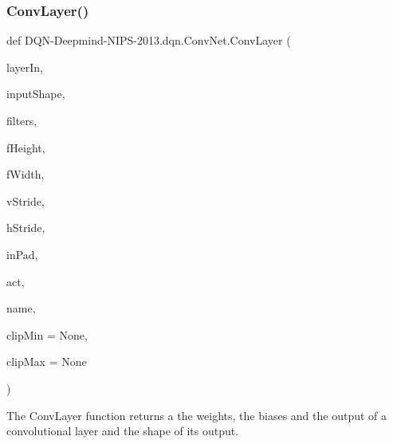 \subsubsection{\texorpdfstring{Conv\+Layer()}{ConvLayer()}}
{\footnotesize\ttfamily def D\+QN-\/Deepmind-\/N\+I\+PS-\/2013.dqn.\+Conv\+Net.\+Conv\+Layer (\begin{DoxyParamCaption}\item[{}]{layer\+In,  }\item[{}]{input\+Shape,  }\item[{}]{filters,  }\item[{}]{f\+Height,  }\item[{}]{f\+Width,  }\item[{}]{v\+Stride,  }\item[{}]{h\+Stride,  }\item[{}]{in\+Pad,  }\item[{}]{act,  }\item[{}]{name,  }\item[{}]{clip\+Min = {\ttfamily None},  }\item[{}]{clip\+Max = {\ttfamily None} }\end{DoxyParamCaption})}



The Conv\+Layer function returns a the weights, the biases and the output of a convolutional layer and the shape of its output. 


